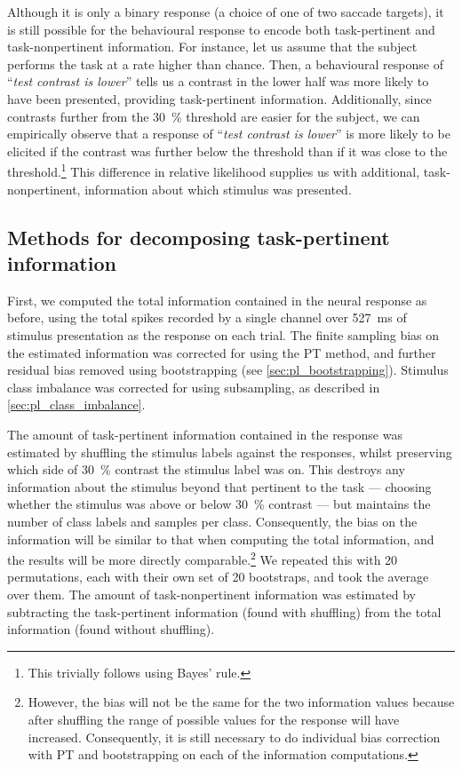 Although it is only a binary response (a choice of one of two saccade targets), it is still possible for the behavioural response to encode both task-pertinent and task-nonpertinent information.
For instance, let us assume that the subject performs the task at a rate higher than chance.
Then, a behavioural response of ``\textit{test contrast is lower}'' tells us a contrast in the lower half was more likely to have been presented, providing task-pertinent information.
Additionally, since contrasts further from the \SI{30}{\percent} threshold are easier for the subject, we can empirically observe that a response of ``\textit{test contrast is lower}'' is more likely to be elicited if the contrast was further below the threshold than if it was close to the threshold.\footnote{This trivially follows using Bayes' rule.}
This difference in relative likelihood supplies us with additional, task-nonpertinent, information about which stimulus was presented.


\subsection{Methods for decomposing task-pertinent information}
\label{sec:task-info-methods}

First, we computed the total information contained in the neural response as before, using the total spikes recorded by a single channel over \SI{527}{\milli\second} of stimulus presentation as the response on each trial.
The finite sampling bias on the estimated information was corrected for using the \ac{PT} method, and further residual bias removed using bootstrapping (see \autoref{sec:pl_bootstrapping}).
Stimulus class imbalance was corrected for using subsampling, as described in \autoref{sec:pl_class_imbalance}.

The amount of task-pertinent information contained in the response was estimated by shuffling the stimulus labels against the responses, whilst preserving which side of \SI{30}{\percent} contrast the stimulus label was on.
This destroys any information about the stimulus beyond that pertinent to the task --- choosing whether the stimulus was above or below \SI{30}{\percent} contrast --- but maintains the number of class labels and samples per class.
Consequently, the bias on the information will be similar to that when computing the total information, and the results will be more directly comparable.\footnote{However, the bias will not be the same for the two information values because after shuffling the range of possible values for the response will have increased. Consequently, it is still necessary to do individual bias correction with \ac{PT} and bootstrapping on each of the information computations.}
We repeated this with \num{20} permutations, each with their own set of \num{20} bootstraps, and took the average over them.
The amount of task-nonpertinent information was estimated by subtracting the task-pertinent information (found with shuffling) from the total information (found without shuffling).

